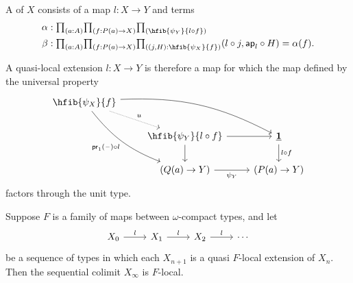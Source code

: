 \begin{comment}
\begin{rmk}
We have an equivalence
\begin{align*}
\hfib{\psi_{X}(a)}{f}
& = \sm{g:Q(a)\to X} g\circ F(a) = f
\end{align*}
This is contractible if and only if there is a term
\begin{align*}
j(f) & : Q(a)\to X \\
J(f) & : j(f)\circ F(a) = f \\
k(f) & : \prd{g:Q(a)\to X}{H:g\circ F(a)=f} g = j(f) \\
K(f) & : \prd{g:Q(a)\to X}{H:g\circ F(a)=f} \trans{k(f)}{H} = J(f).
\end{align*}
\end{rmk}
\end{comment}

\begin{defn}
A  of $X$ consists of a map $l:X\to Y$ and terms
\begin{align*}
\alpha & : \prd{a:A}{f:P(a)\to X}\hfib{\psi_Y}{l\circ f} \\
\beta & : \prd{a:A}{f:P(a)\to X}{(j,H):\hfib{\psi_X}{f}}\pairr{l\circ j,\apfunc{l}\circ H}=\alpha(f).
\end{align*}
\end{defn}

\begin{rmk}
A quasi-local extension $l:X\to Y$ is therefore a map for which the map defined by the universal property
\begin{equation*}
\begin{tikzcd}
\hfib{\psi_X}{f} \arrow[drr,bend left=15] \arrow[ddr, bend right=15,swap,"\proj1(\blank)\circ l"] \arrow[dr,densely dotted,"u"] \\
& \hfib{\psi_Y}{l\circ f} \arrow[r] \arrow[d] & \unit \arrow[d,"l\circ f"] \\
& (Q(a)\to Y) \arrow[r,swap,"\psi_Y"] & (P(a)\to Y)
\end{tikzcd}
\end{equation*}
factors through the unit type.
\end{rmk}

\begin{thm}
Suppose $F$ is a family of maps between $\omega$-compact types, and let
\begin{equation*}
\begin{tikzcd}
X_0 \arrow[r,"l"] & X_1 \arrow[r,"l"] & X_2 \arrow[r,"l"] & \cdots
\end{tikzcd}
\end{equation*}
be a sequence of types in which each $X_{n+1}$ is a quasi $F$-local extension of $X_n$. Then the sequential colimit $X_\infty$ is $F$-local.
\end{thm}

